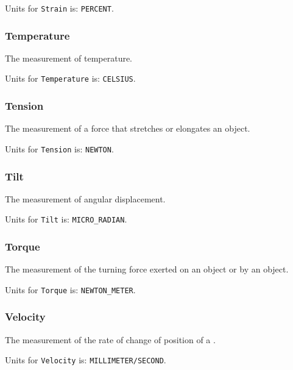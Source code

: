 Units for \texttt{Strain} is: \texttt{PERCENT}.

\FloatBarrier

\subsubsection{Temperature}
  \label{sec:Temperature}


The measurement of temperature.


Units for \texttt{Temperature} is: \texttt{CELSIUS}.

\FloatBarrier

\subsubsection{Tension}
  \label{sec:Tension}


The measurement of a force that stretches or elongates an object.


Units for \texttt{Tension} is: \texttt{NEWTON}.

\FloatBarrier

\subsubsection{Tilt}
  \label{sec:Tilt}


The measurement of angular displacement.


Units for \texttt{Tilt} is: \texttt{MICRO_RADIAN}.

\FloatBarrier

\subsubsection{Torque}
  \label{sec:Torque}


The measurement of the turning force exerted on an object or by an object.


Units for \texttt{Torque} is: \texttt{NEWTON_METER}.

\FloatBarrier

\subsubsection{Velocity}
  \label{sec:Velocity}


The measurement of the rate of change of position of a .


Units for \texttt{Velocity} is: \texttt{MILLIMETER/SECOND}.

\FloatBarrier

